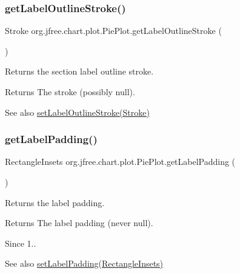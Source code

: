 \subsubsection{\texorpdfstring{get\+Label\+Outline\+Stroke()}{getLabelOutlineStroke()}}
{\footnotesize\ttfamily Stroke org.\+jfree.\+chart.\+plot.\+Pie\+Plot.\+get\+Label\+Outline\+Stroke (\begin{DoxyParamCaption}{ }\end{DoxyParamCaption})}

Returns the section label outline stroke.

\begin{DoxyReturn}{Returns}
The stroke (possibly {\ttfamily null}).
\end{DoxyReturn}
\begin{DoxySeeAlso}{See also}
\mbox{\hyperlink{classorg_1_1jfree_1_1chart_1_1plot_1_1_pie_plot_a394062ead206b4b24ab655a8868bfa5e}{set\+Label\+Outline\+Stroke(\+Stroke)}} 
\end{DoxySeeAlso}
\mbox{\label{classorg_1_1jfree_1_1chart_1_1plot_1_1_pie_plot_af370c04b73e9e3f5b5aaa5e74dc8d9b3}} 
\subsubsection{\texorpdfstring{get\+Label\+Padding()}{getLabelPadding()}}
{\footnotesize\ttfamily Rectangle\+Insets org.\+jfree.\+chart.\+plot.\+Pie\+Plot.\+get\+Label\+Padding (\begin{DoxyParamCaption}{ }\end{DoxyParamCaption})}

Returns the label padding.

\begin{DoxyReturn}{Returns}
The label padding (never {\ttfamily null}).
\end{DoxyReturn}
\begin{DoxySince}{Since}
1..
\end{DoxySince}
\begin{DoxySeeAlso}{See also}
\mbox{\hyperlink{classorg_1_1jfree_1_1chart_1_1plot_1_1_pie_plot_a4edc5bf4dba5fc8192522dd8b1a5c474}{set\+Label\+Padding(\+Rectangle\+Insets)}} 
\end{DoxySeeAlso}
\mbox{\label{classorg_1_1jfree_1_1chart_1_1plot_1_1_pie_plot_a74d3e481e1a19221ec0609717eed9197}} 
